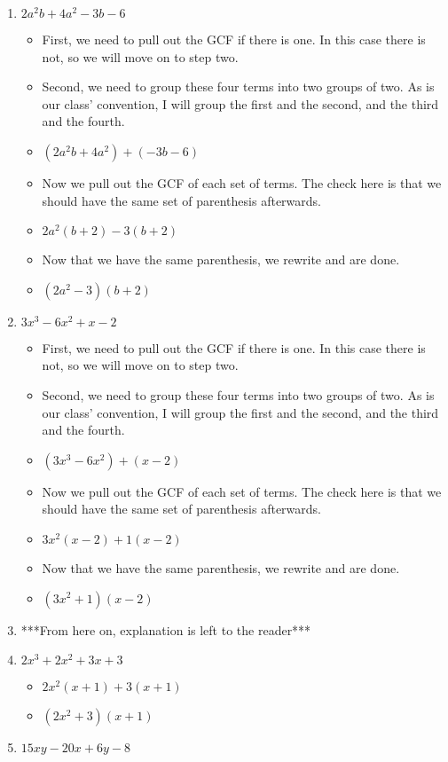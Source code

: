 \documentclass{article}
\begin{document}
\begin{enumerate}
\item $2a^{2}b + 4a^{2} - 3b - 6$
  \begin{itemize}
  \item First, we need to pull out the GCF if there is one. In this case there is not, so we will move on to step two.
  \item Second, we need to group these four terms into two groups of two. As is our class' convention, I will group the first and the second, and the third and the fourth.
  \item [] $(2a^{2}b+4a^{2}) +(-3b-6)$
  \item Now we pull out the GCF of each set of terms. The check here is that we should have the same set of parenthesis afterwards.
  \item [] $2a^{2}(b+2)-3(b+2)$
  \item Now that we have the same parenthesis, we rewrite and are done.
  \item [] $(2a^{2}-3)(b+2)$
  \end{itemize}
\item $3x^{3} - 6x^{2} + x - 2$
  \begin{itemize}
  \item First, we need to pull out the GCF if there is one. In this case there is not, so we will move on to step two.
  \item Second, we need to group these four terms into two groups of two. As is our class' convention, I will group the first and the second, and the third and the fourth.
  \item [] $(3x^{3}-6x^{2}) +(x-2)$
  \item Now we pull out the GCF of each set of terms. The check here is that we should have the same set of parenthesis afterwards.
  \item [] $3x^{2}(x-2)+1(x-2)$
  \item Now that we have the same parenthesis, we rewrite and are done.
  \item [] $(3x^{2}+1)(x-2)$
  \end{itemize}
\item [] ***From here on, explanation is left to the reader***
\item $2x^{3} + 2x^{2} + 3x + 3$
  \begin{itemize}
  \item $2x^{2}(x+1)+3(x+1)$
  \item $(2x^{2}+3)(x+1)$
  \end{itemize}
\item $15xy - 20x + 6y - 8$

\end{enumerate}
\end{document}
